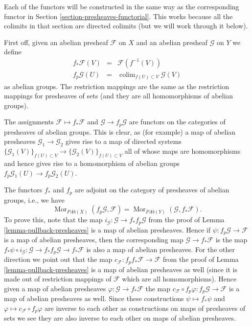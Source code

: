 \documentclass{stacks-project}
\theoremstyle{plain}
\theoremstyle{definition}
\theoremstyle{remark}
\numberwithin{equation}{subsection}
\def\colim{\mathop{\mathrm{colim}}\nolimits}
\def\Mor{\mathop{\mathrm{Mor}}\nolimits}
\begin{document}
\medskip\noindent
Each of the functors will be constructed in the same
way as the corresponding functor in
Section \ref{section-presheaves-functorial}.
This works because all the colimits in that section
are directed colimits (but we will work through it below).

\medskip\noindent
First off, given an abelian presheaf $\mathcal{F}$ on $X$ and
an abelian presheaf $\mathcal{G}$ on $Y$ we define
\begin{eqnarray*}
f_*\mathcal{F}(V) & = & \mathcal{F}(f^{-1}(V)) \\
f_p\mathcal{G}(U) & = & \colim_{f(U) \subset V} \mathcal{G}(V)
\end{eqnarray*}
as abelian groups. The restriction mappings are the same as
the restriction mappings for presheaves of sets (and they are
all homomorphisms of abelian groups).

\medskip\noindent
The assignments $\mathcal{F} \mapsto f_*\mathcal{F}$ and
$\mathcal{G} \to f_p\mathcal{G}$ are functors on
the categories of presheaves of abelian groups.
This is clear, as (for example) a map of abelian presheaves
$\mathcal{G}_1 \to \mathcal{G}_2$ gives rise to a map of
directed systems
$\{\mathcal{G}_1(V)\}_{f(U) \subset V} \to
\{\mathcal{G}_2(V)\}_{f(U) \subset V}$
all of whose maps are homomorphisms
and hence gives rise to a homomorphism of abelian groups
$f_p\mathcal{G}_1(U) \to f_p\mathcal{G}_2(U)$.

\medskip\noindent
The functors $f_*$ and $f_p$ are adjoint on the
category of presheaves of abelian groups, i.e., we have
$$
\Mor_{\textit{PAb}(X)}(f_p\mathcal{G}, \mathcal{F})
=
\Mor_{\textit{PAb}(Y)}(\mathcal{G}, f_*\mathcal{F}).
$$
To prove this, note that the map
$i_\mathcal{G} : \mathcal{G} \to f_* f_p\mathcal{G}$ from the proof
of Lemma \ref{lemma-pullback-presheaves}
is a map of abelian presheaves. Hence if
$\psi : f_p\mathcal{G} \to \mathcal{F}$
is a map of abelian presheaves, then the corresponding map
$\mathcal{G} \to f_*\mathcal{F}$ is the map
$f_*\psi \circ i_\mathcal{G} :
\mathcal{G} \to f_* f_p \mathcal{G} \to f_* \mathcal{F}$
is also a map of abelian presheaves. For the other direction
we point out that the map
$c_\mathcal{F} : f_p f_* \mathcal{F} \to \mathcal{F}$
from the proof of Lemma \ref{lemma-pullback-presheaves} is a
map of abelian presheaves as well (since it is made out of restriction
mappings of $\mathcal{F}$ which are all homomorphisms). Hence
given a map of abelian presheaves $\varphi : \mathcal{G} \to f_*\mathcal{F}$
the map
$c_\mathcal{F} \circ f_p\varphi : f_p\mathcal{G} \to \mathcal{F}$
is a map of abelian presheaves as well. Since these constructions
$\psi \mapsto f_*\psi$ and $\varphi \mapsto c_\mathcal{F} \circ f_p\varphi$
are inverse to each other as constructions on maps of presheaves of sets
we see they are also inverse to each other on maps of abelian presheaves.
\end{document}
